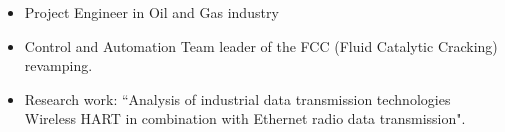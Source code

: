 \documentclass[10pt,a4paper,ragged2e]{altacv}
\begin{document}
\divider

\begin{itemize}
\item Project Engineer in Oil and Gas industry
\item Control and Automation Team leader of the FCC (Fluid Catalytic Cracking) revamping. 
\item Research work: “Analysis of industrial data transmission technologies Wireless HART in combination with Ethernet radio data transmission".
\end{itemize}

\divider










\end{document}
